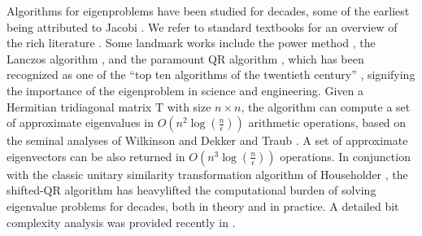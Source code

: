 \documentclass{article}
\newcommand\matT{\boldsymbol{\mathrm{T}}}
\begin{document}
    Algorithms for eigenproblems have been studied for decades, some of the earliest being attributed to Jacobi \cite{jacobi1846leichtes,golub2000eigenvalue}. We refer to standard textbooks for an overview of the rich literature  \cite{demmel1997applied,golub2013matrix,parlett1998symmetric,bhatia2007perturbation,saad2011numerical}. 
    Some landmark works include the power method \cite{mises1929praktische}, the Lanczos algorithm \cite{lanczos1950iteration}, and the paramount QR algorithm \cite{francis1961qr,francis1962qr,kublanovskaya1962some}, which  has been recognized as one of the ``top ten algorithms of the twentieth century'' \cite{dongarra2000guest}, signifying the importance of the eigenproblem in science and engineering.   
    Given a Hermitian tridiagonal matrix $\matT$ with size $n\times n$, the algorithm can compute a set of approximate eigenvalues in $ O(n^2\log(\tfrac{n}{\epsilon}))$ arithmetic operations, based on the seminal analyses of Wilkinson \cite{wilkinson1968global} and Dekker and Traub \cite{dekker1971shifted}. A set of approximate eigenvectors can be also returned in $ O(n^3\log(\frac{n}{\epsilon}))$ operations. In conjunction with the classic unitary similarity transformation algorithm of Householder \cite{householder1958unitary}, the shifted-QR algorithm has heavylifted the computational burden of solving eigenvalue problems for decades, both in theory and in practice. 
    A detailed bit complexity analysis was provided recently in \cite{banks2021global1,banks2022global2,banks2022global3}.
    
\end{document}
